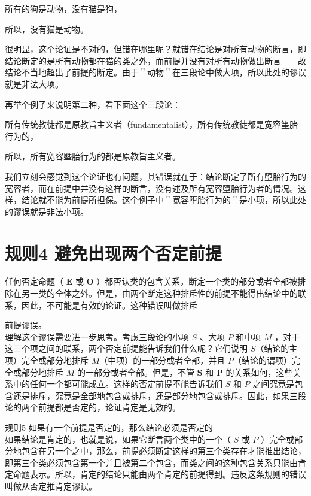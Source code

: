 \begin{displayquote}
所有的狗是动物，没有猫是狗，
\end{displayquote}

\begin{displayquote}
所以，没有猫是动物。
\end{displayquote}

很明显，这个论证是不对的，但错在哪里呢？就错在结论是对所有动物的断言，即结论断定的是所有动物都在猫的类之外，而前提并没有对所有动物做出断言——故结论不当地超出了前提的断定。由于＂动物＂在三段论中做大项，所以此处的谬误就是非法大项。

再举个例子来说明第二种，看下面这个三段论：

所有传统教徒都是原教旨主义者（fundamentalist），所有传统教徒都是宽容筀胎行为的，

所以，所有宽容塈胎行为的都是原教旨主义者。

我们立刻会感觉到这个论证也有问题，其错误就在于：结论断定了所有堕胎行为的宽容者，而在前提中并没有这样的断言，没有述及所有宽容堕胎行为者的情况。这样，结论就不能为前提所担保。这个例子中＂宽容堕胎行为的＂是小项，所以此处的谬误就是非法小项。

\section*{规则4 避免出现两个否定前提}
任何否定命题（ $\mathbf{E}$ 或 $\mathbf{O}$ ）都否认类的包含关系，断定一个类的部分或者全部被排除在另一类的全体之外。但是，由两个断定这种排斥性的前提不能得出结论中的联系，因此，不可能是有效的论证。这种错误叫做排斥

前提谬误。\\
理解这个谬误需要进一步思考。考虑三段论的小项 $S$ 、大项 $P$ 和中项 $M$ ，对于这三个项之间的联系，两个否定前提能告诉我们什么呢？它们说明 $S$（结论的主项）完全或部分地排斥 $M$（中项）的一部分或者全部，并且 $P$（结论的谓项）完全或部分地排斥 $M$ 的一部分或者全部。但是，不管 $\boldsymbol{S}$ 和 $\boldsymbol{P}$ 的关系如何，这些关系中的任何一个都可能成立。这样的否定前提不能告诉我们 $S$ 和 $P$ 之间究竟是包含还是排斥，究竟是全部地包含或排斥，还是部分地包含或排斥。因此，如果三段论的两个前提都是否定的，论证肯定是无效的。

规则5 如果有一个前提是否定的，那么结论必须是否定的\\
如果结论是肯定的，也就是说，如果它断言两个类中的一个（ $S$ 或 $P$ ）完全或部分地包含在另一个之中，那么，前提必须断定这样的第三个类存在才能推出结论，即第三个类必须包含第一个并且被第二个包含，而类之间的这种包含关系只能由肯定命题表示。所以，肯定的结论只能由两个肯定的前提得到。违反这条规则的错误叫做从否定推肯定谬误。

